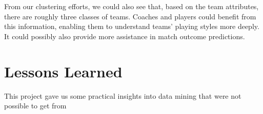 \documentclass[11pt]{article}
\begin{document}
From our clustering efforts, we could also see that, based on the team attributes, there are roughly three classes of teams.
Coaches and players could benefit from this information, enabling them to understand teams' playing styles more deeply.
It could possibly also provide more assistance in match outcome predictions.

\section{Lessons Learned}
This project gave us some practical insights into data mining that were not possible to get from




\end{document}
